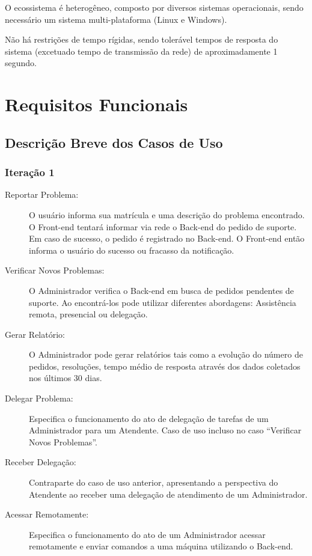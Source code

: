 \documentclass[brazil,times]{abnt}
\begin{document}
O ecossistema é heterogêneo, composto por diversos sistemas operacionais, sendo
necessário um sistema multi-plataforma (Linux e Windows).

Não há restrições de tempo rígidas, sendo tolerável tempos de resposta do
sistema (excetuado tempo de transmissão da rede) de aproximadamente 1 segundo.

\chapter{Requisitos Funcionais}
\section{Descrição Breve dos Casos de Uso}
\subsection{Iteração 1}
\begin{description}
  \item[Reportar Problema:] O usuário informa sua matrícula e uma descrição do
  problema encontrado. O Front-end tentará informar via rede o Back-end do
  pedido de suporte. Em caso de sucesso, o pedido é registrado no Back-end. O
  Front-end então informa o usuário do sucesso ou fracasso da notificação.
  \item[Verificar Novos Problemas:] O Administrador verifica o Back-end em
  busca de pedidos pendentes de suporte. Ao encontrá-los pode utilizar
  diferentes abordagens: Assistência remota, presencial ou delegação.
  \item[Gerar Relatório:] O Administrador pode gerar relatórios tais como a
  evolução do número de pedidos, resoluções, tempo médio de resposta através dos
  dados coletados nos últimos 30 dias.
  \item[Delegar Problema:] Especifica o funcionamento do ato de delegação de
  tarefas de um Administrador para um Atendente. Caso de uso incluso no caso
  ``Verificar Novos Problemas''.
  \item[Receber Delegação:] Contraparte do caso de uso anterior, apresentando a
  perspectiva do Atendente ao receber uma delegação de atendimento de um
  Administrador.
  \item[Acessar Remotamente:] Especifica o funcionamento do ato de um
  Administrador acessar remotamente e enviar comandos a uma máquina utilizando o
  Back-end.
\end{description}
\end{document}
